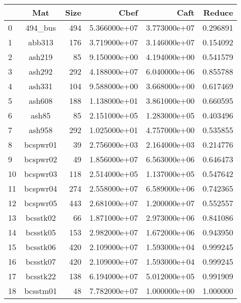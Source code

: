 \documentclass[8pt]{report}
\begin{document}
	
	\begin{table*}
	\center
		\begin{tabular}{|l|c|r|r|r|r|}
\toprule
{} &                      Mat &  Size &          Cbef &          Caft &    Reduce \\
\midrule
0   &                  494\_bus &   494 &  5.366000e+07 &  3.773000e+07 &  0.296891 \\
1   &                   abb313 &   176 &  3.719000e+07 &  3.146000e+07 &  0.154092 \\
2   &                   ash219 &    85 &  9.150000e+00 &  4.194000e+00 &  0.541579 \\
3   &                   ash292 &   292 &  4.188000e+07 &  6.040000e+06 &  0.855788 \\
4   &                   ash331 &   104 &  9.588000e+00 &  3.668000e+00 &  0.617469 \\
5   &                   ash608 &   188 &  1.138000e+01 &  3.861000e+00 &  0.660595 \\
6   &                    ash85 &    85 &  2.151000e+05 &  1.283000e+05 &  0.403496 \\
7   &                   ash958 &   292 &  1.025000e+01 &  4.757000e+00 &  0.535855 \\
8   &                 bcspwr01 &    39 &  2.756000e+03 &  2.164000e+03 &  0.214776 \\
9   &                 bcspwr02 &    49 &  1.856000e+07 &  6.563000e+06 &  0.646473 \\
10  &                 bcspwr03 &   118 &  2.514000e+05 &  1.137000e+05 &  0.547642 \\
11  &                 bcspwr04 &   274 &  2.558000e+07 &  6.589000e+06 &  0.742365 \\
12  &                 bcspwr05 &   443 &  2.681000e+07 &  1.200000e+07 &  0.552557 \\
13  &                 bcsstk02 &    66 &  1.871000e+07 &  2.973000e+06 &  0.841086 \\
14  &                 bcsstk05 &   153 &  2.982000e+07 &  1.672000e+06 &  0.943950 \\
15  &                 bcsstk06 &   420 &  2.109000e+07 &  1.593000e+04 &  0.999245 \\
16  &                 bcsstk07 &   420 &  2.109000e+07 &  1.593000e+04 &  0.999245 \\
17  &                 bcsstk22 &   138 &  6.194000e+07 &  5.012000e+05 &  0.991909 \\
18  &                 bcsstm01 &    48 &  7.782000e+07 &  1.000000e+00 &  1.000000 \\

\end{tabular}
\end{table*}
\end{document}
